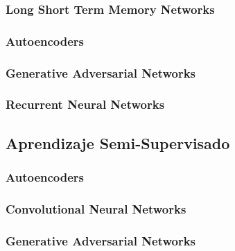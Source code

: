 \subsubsection{Long Short Term Memory Networks}
\subsubsection{Autoencoders}
\subsubsection{Generative Adversarial Networks}
\subsubsection{Recurrent Neural Networks}

\subsection{Aprendizaje Semi-Supervisado}
\subsubsection{Autoencoders}
\subsubsection{Convolutional Neural Networks}
\subsubsection{Generative Adversarial Networks}